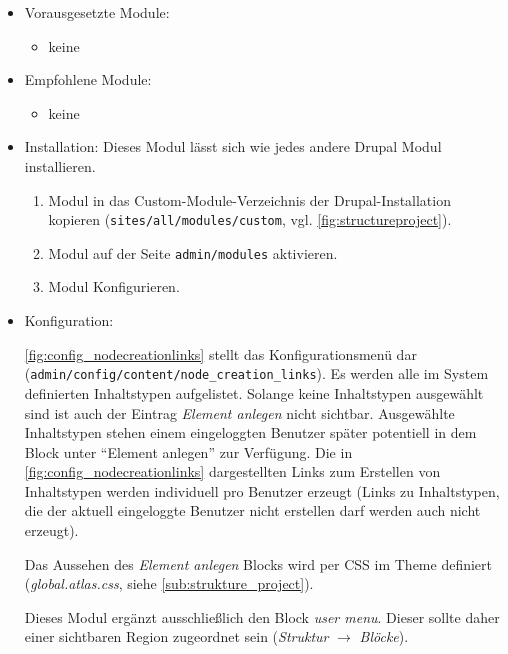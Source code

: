 \begin{itemize}[parsep=0pt, itemsep=5.0pt plus 2.0pt minus 1.0pt, leftmargin=*]
	\item Vorausgesetzte Module:
	\begin{itemize}
		\item keine
	\end{itemize}
	
	\item Empfohlene Module:
	\begin{itemize}
		\item keine
	\end{itemize}
	
	\item Installation: 
	Dieses Modul lässt sich wie jedes andere Drupal Modul installieren.
	\begin{enumerate}
		\item Modul in das Custom-Module-Verzeichnis der Drupal-Installation kopieren  (\zB \lstinline|sites/all/modules/custom|, vgl. \cref{fig:structureproject}).
		\item Modul auf der Seite \lstinline|admin/modules| aktivieren.
		\item Modul Konfigurieren.
	\end{enumerate}
	
	\item Konfiguration:
	
	\cref{fig:config_nodecreationlinks} stellt das Konfigurationsmenü dar (\lstinline|admin/config/content/node_creation_links|). Es werden alle im System definierten Inhaltstypen aufgelistet. Solange keine Inhaltstypen ausgewählt sind ist auch der Eintrag \textit{Element anlegen} nicht sichtbar. Ausgewählte Inhaltstypen stehen einem eingeloggten Benutzer später potentiell in dem Block unter \enquote{Element anlegen} zur Verfügung. Die in \cref{fig:config_nodecreationlinks} dargestellten Links zum Erstellen von Inhaltstypen werden individuell pro Benutzer erzeugt (Links zu Inhaltstypen, die der aktuell eingeloggte Benutzer nicht erstellen darf werden auch nicht erzeugt). 
	
	Das Aussehen des \textit{Element anlegen} Blocks wird per CSS im Theme definiert (\zB \textit{global.atlas.css}, siehe \cref{sub:strukture_project}).
	
	Dieses Modul ergänzt ausschließlich den Block \textit{user menu}. Dieser sollte daher einer sichtbaren Region zugeordnet sein (\textit{Struktur} $\rightarrow$ \textit{Blöcke}).
	
\end{itemize}




